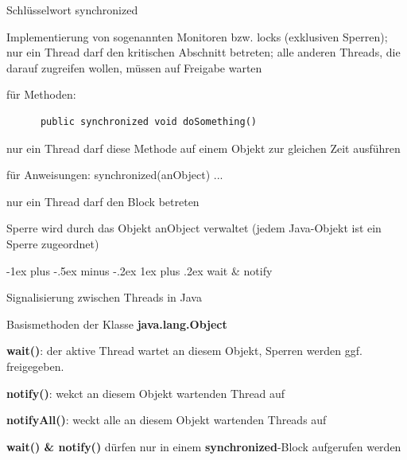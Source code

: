 \documentclass[10pt]{article}
\makeatletter
\renewcommand{\subsubsection}{\@startsection{subsubsection}{3}{0mm}%
                                {-1ex plus -.5ex minus -.2ex}%
                                {1ex plus .2ex}%
                                {\normalfont\small\bfseries}}
\makeatother
\begin{document}
  \begin{itemize*}
    \item Schlüsselwort synchronized
    \begin{itemize*}
      \item Implementierung von sogenannten Monitoren bzw. locks (exklusiven Sperren); nur ein Thread darf den kritischen Abschnitt betreten; alle anderen Threads, die darauf zugreifen wollen, müssen auf Freigabe warten
      \item für Methoden:
      \begin{lstlisting}
      public synchronized void doSomething()
  \end{lstlisting}
      \begin{itemize*}
        \item nur ein Thread darf diese Methode auf einem Objekt zur gleichen Zeit ausführen
      \end{itemize*}
      \item für Anweisungen: synchronized(anObject) { ... }
      \begin{itemize*}
        \item nur ein Thread darf den Block betreten
        \item Sperre wird durch das Objekt anObject verwaltet (jedem Java-Objekt ist ein Sperre zugeordnet)
      \end{itemize*}
    \end{itemize*}
  \end{itemize*}
  
  \subsubsection{wait \& notify}
  \begin{itemize*}
    \item Signalisierung zwischen Threads in Java
    \item Basismethoden der Klasse \textbf{java.lang.Object}
    \item \textbf{wait()}: der aktive Thread wartet an diesem Objekt, Sperren werden ggf. freigegeben.
    \item \textbf{notify()}: wekct an diesem Objekt wartenden Thread auf
    \item \textbf{notifyAll()}: weckt alle an diesem Objekt wartenden Threads auf
    \item \textbf{wait() \& notify()} dürfen nur in einem \textbf{synchronized}-Block aufgerufen werden
  \end{itemize*}
  
\end{document}
